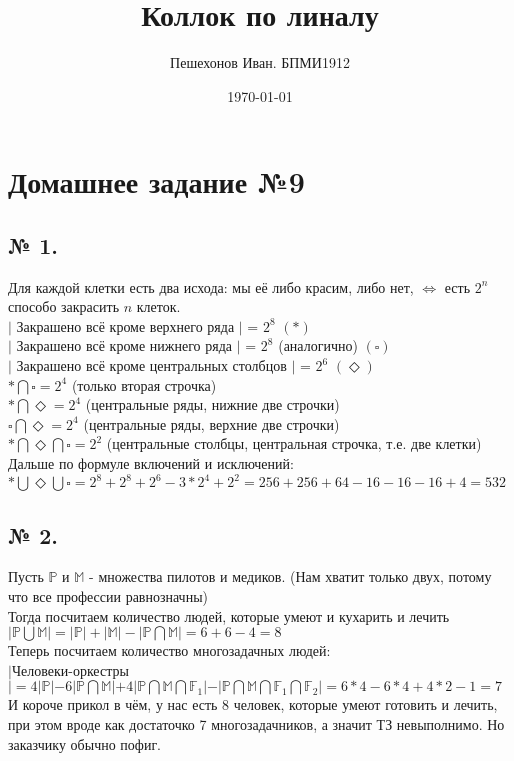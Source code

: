 \documentclass[a4paper,11pt]{report}
\title{Коллок по линалу}
\author{Пешехонов Иван. БПМИ1912}
\date{\today}
\begin{document}
\chapter{Домашнее задание №9}
\section{№ 1.}
Для каждой клетки есть два исхода: мы её либо красим, либо нет, $\Leftrightarrow$ есть $2^n$ способо закрасить $n$ клеток.\\
$|$ Закрашено всё кроме верхнего ряда $|$ = $2^8$ $(*)$\\
$|$ Закрашено всё кроме нижнего ряда $|$ = $2^8$ (аналогично) $(\square)$\\
$|$ Закрашено всё кроме центральных столбцов $|$ = $2^6$ $(\Diamond)$\\
$* \bigcap \square = 2^4$ (только вторая строчка)\\
$* \bigcap \Diamond = 2^4$ (центральные ряды, нижние две строчки)\\
$\square \bigcap \Diamond = 2^4$ (центральные ряды, верхние две строчки)\\
$* \bigcap \Diamond \bigcap \square = 2^2$ (центральные столбцы, центральная строчка, т.е. две клетки)\\
Дальше по формуле включений и исключений:\\
$* \bigcup \Diamond \bigcup \square = 2^8 +2^8 + 2^6 - 3 * 2^4 + 2^2 
= 256 + 256 + 64 - 16 - 16 - 16 + 4 = 532$\\
\section{№ 2.}
Пусть $\mathbb{P}$ и $\mathbb{M}$ - множества пилотов и медиков. 
(Нам хватит только двух, потому что все профессии равнозначны)\\
Тогда посчитаем количество людей, которые умеют и кухарить и лечить\\
$|\mathbb{P} \bigcup \mathbb{M}| = |\mathbb{P}| + |\mathbb{M}| - |\mathbb{P} \bigcap \mathbb{M}| = 6 + 6 - 4 = 8$\\
Теперь посчитаем количество многозадачных людей:\\
$|$Человеки-оркестры$| = 4|\mathbb{P}| - 6|\mathbb{P} \bigcap \mathbb{M}| + 
4|\mathbb{P} \bigcap \mathbb{M} \bigcap \mathbb{F}_1| - 
|\mathbb{P} \bigcap \mathbb{M} \bigcap \mathbb{F}_1 \bigcap \mathbb{F}_2| =
6 * 4 - 6 * 4 + 4*2 - 1 = 7$\\
И короче прикол в чём, у нас есть 8 человек, которые умеют готовить и лечить, 
при этом вроде как достаточко 7 многозадачников, а значит ТЗ невыполнимо.
Но заказчику обычно пофиг.
\end{document}
